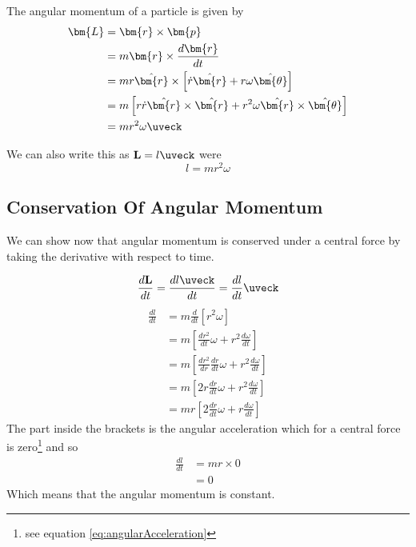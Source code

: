The angular momentum of a particle is given by
\begin{align}
\bm{L}&=\bm{r} \times \bm{p} \nonumber \\
&=m \bm{r}\times \frac{d \bm{r}}{d t} \nonumber \\
&=m r \hat{\bm{r}} \times \left[ \dot{r} \hat{\bm{r}} + r \omega \hat{\bm{\theta}} \right] \nonumber \\
&=m \left[ r \dot{r}\hat{\bm{r}} \times \hat{\bm{r}} + r^2 \omega \hat{\bm{r}} \times\hat{\bm{\theta}} \right] \nonumber \\
&=m r^2 \omega \uveck \label{eq:AngularMomentum}
\end{align}

We can also write this as $\mathbf{L} = l \uveck$ were
\begin{equation}
l=mr^2\omega \label{eq:AngularMomentumScalar}
\end{equation}

\subsection{Conservation Of Angular Momentum}
We can show now that angular momentum is conserved under a central force by taking the derivative with respect to time.

\begin{equation}
\frac{d\mathbf{L}}{dt} = \frac{d l \uveck}{dt} = \frac{d l}{dt}\uveck
\end{equation}
\begin{align}
\frac{dl}{dt}&=m\frac{d}{dt}\left[r^2\omega\right]\nonumber \\
&=m\left[\frac{dr^2}{dt}\omega + r^2\frac{d\omega}{dt}\right]\nonumber \\
&=m\left[\frac{dr^2}{dr}\frac{dr}{dt}\omega + r^2\frac{d\omega}{dt}\right] \nonumber \\
&=m\left[2r\frac{dr}{dt}\omega + r^2\frac{d\omega}{dt}\right] \nonumber \\
&=mr\left[2\frac{dr}{dt}\omega + r\frac{d\omega}{dt}\right]
\end{align}
The part inside the brackets is the angular acceleration which for a central force is zero\footnote{see equation \ref{eq:angularAcceleration}} and so
\begin{align}
\frac{dl}{dt}&=mr \times 0 \nonumber \\
&=0
\end{align}
Which means that the angular momentum is constant.